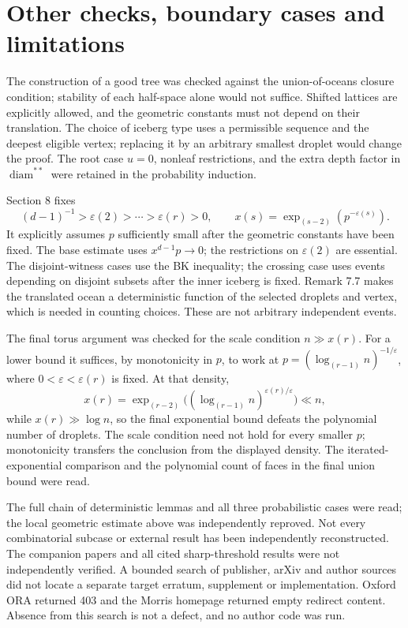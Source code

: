 \documentclass[10pt]{article}
\begin{document}
\section*{Other checks, boundary cases and limitations}
The construction of a good tree was checked against the union-of-oceans closure condition; stability of each half-space alone would not suffice. Shifted lattices are explicitly allowed, and the geometric constants must not depend on their translation. The choice of iceberg type uses a permissible sequence and the deepest eligible vertex; replacing it by an arbitrary smallest droplet would change the proof. The root case \(u=0\), nonleaf restrictions, and the extra depth factor in \(\operatorname{diam}^{**}\) were retained in the probability induction.\par
Section 8 fixes \[(d-1)^{-1}>\varepsilon(2)>\cdots>\varepsilon(r)>0,\qquad
 x(s)=\exp_{(s-2)}(p^{-\varepsilon(s)}).\] It explicitly assumes \(p\) sufficiently small after the geometric constants have been fixed. The base estimate uses \(x^{d-1}p\to0\); the restrictions on \(\varepsilon(2)\) are essential. The disjoint-witness cases use the BK inequality; the crossing case uses events depending on disjoint subsets after the inner iceberg is fixed. Remark 7.7 makes the translated ocean a deterministic function of the selected droplets and vertex, which is needed in counting choices. These are not arbitrary independent events.\par
The final torus argument was checked for the scale condition \(n\gg x(r)\). For a lower bound it suffices, by monotonicity in \(p\), to work at \(p=(\log_{(r-1)}n)^{-1/\varepsilon}\), where \(0<\varepsilon<\varepsilon(r)\) is fixed. At that density, \[x(r)=\exp_{(r-2)}
 \bigl((\log_{(r-1)}n)^{\varepsilon(r)/\varepsilon}\bigr)\ll n,\] while \(x(r)\gg\log n\), so the final exponential bound defeats the polynomial number of droplets. The scale condition need not hold for every smaller \(p\); monotonicity transfers the conclusion from the displayed density. The iterated-exponential comparison and the polynomial count of faces in the final union bound were read.\par
The full chain of deterministic lemmas and all three probabilistic cases were read; the local geometric estimate above was independently reproved. Not every combinatorial subcase or external result has been independently reconstructed. The companion papers and all cited sharp-threshold results were not independently verified. A bounded search of publisher, arXiv and author sources did not locate a separate target erratum, supplement or implementation. Oxford ORA returned 403 and the Morris homepage returned empty redirect content. Absence from this search is not a defect, and no author code was run.\par
\end{document}
